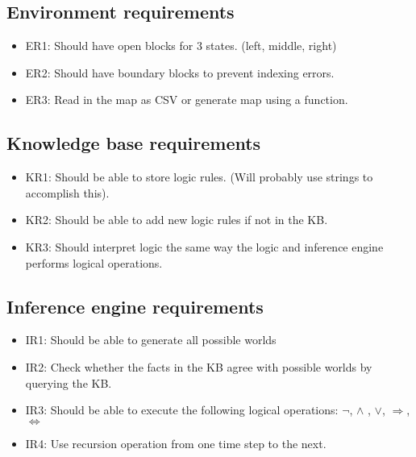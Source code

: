 \documentclass{article}
\begin{document}
\subsection{Environment requirements}

\begin{itemize}
    \item ER1: Should have open blocks for 3 states. (left, middle, right)
    \item ER2: Should have boundary blocks to prevent indexing errors.
    \item ER3: Read in the map as CSV or generate map using a function.
\end{itemize}


\subsection{Knowledge base requirements}

\begin{itemize}
    \item KR1: Should be able to store logic rules. (Will probably use strings to accomplish this).
    \item KR2: Should be able to add new logic rules if not in the KB.
    \item KR3: Should interpret logic the same way the logic and inference engine performs logical operations.
\end{itemize}

\subsection{Inference engine requirements}

\begin{itemize}
    \item IR1: Should be able to generate all possible worlds
    \item IR2: Check whether the facts in the KB agree with possible worlds by querying the KB.
    \item IR3: Should be able to execute the following logical operations:  $\neg$, $\wedge$ , $\vee$, $\Rightarrow$, $\Leftrightarrow$
    \item IR4: Use recursion operation from one time step to the next.
\end{itemize}



\end{document}
